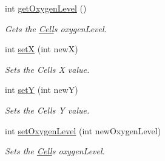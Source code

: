 \begin{DoxyCompactItemize}
\mbox{\label{class_cell_a2f33cee2863b092b4bf0bca50d6a0e58}} 
int \hyperlink{class_cell_a2f33cee2863b092b4bf0bca50d6a0e58}{get\+Oxygen\+Level} ()
\begin{DoxyCompactList}\small\item\em Gets the \hyperlink{class_cell}{Cell}\textquotesingle{}s oxygen\+Level. \end{DoxyCompactList}\item 
\mbox{\label{class_cell_a989cee545edaa818bab0ae6627419250}} 
int \hyperlink{class_cell_a989cee545edaa818bab0ae6627419250}{setX} (int newX)
\begin{DoxyCompactList}\small\item\em Sets the Cells X value. \end{DoxyCompactList}\item 
\mbox{\label{class_cell_a4cc90d99e603947aca4d36636c5868f8}} 
int \hyperlink{class_cell_a4cc90d99e603947aca4d36636c5868f8}{setY} (int newY)
\begin{DoxyCompactList}\small\item\em Sets the Cells Y value. \end{DoxyCompactList}\item 
\mbox{\label{class_cell_a15a5726bfb5e111fb3de449a70107b36}} 
int \hyperlink{class_cell_a15a5726bfb5e111fb3de449a70107b36}{set\+Oxygen\+Level} (int new\+Oxygen\+Level)
\begin{DoxyCompactList}\small\item\em Sets the \hyperlink{class_cell}{Cell}\textquotesingle{}s oxygen\+Level. \end{DoxyCompactList}\end{DoxyCompactItemize}
